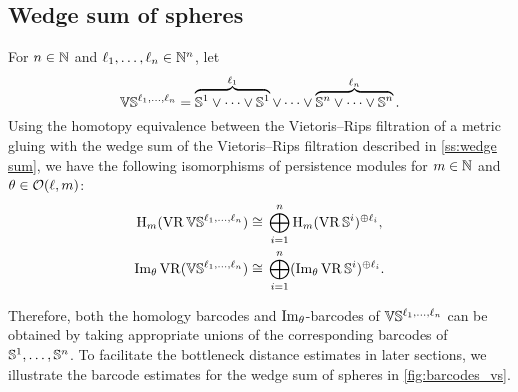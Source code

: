 

\subsection{Wedge sum of spheres}


For $n \in \mathbb{N}$ and $\ell_1, \dots, \ell_n \in \mathbb{N}^n$, let
\[
\mathbb{V}\mathbb{S}^{\ell_1,\dots,\ell_n} =
\overbrace{\mathbb{S}^1\vee\dots\vee\mathbb{S}^1}^{\ell_1} \vee\dots\vee \overbrace{\mathbb{S}^n\vee\dots\vee\mathbb{S}^n}^{\ell_n}.
\]
Using the homotopy equivalence between the Vietoris--Rips filtration of a metric gluing with the wedge sum of the Vietoris--Rips filtration described in \cref{ss:wedge sum}, we have the following isomorphisms of persistence modules for \(m \in \mathbb{N}\) and \(\theta \in \mathcal{O}(\ell,m)\):
\[
\begin{split}
	\mathrm{H}_m (\operatorname{VR}\mathbb{V}\mathbb{S}^{\ell_1,\dots,\ell_n}) &\cong \, \bigoplus_{i=1}^n \mathrm{H}_m (\operatorname{VR}\mathbb{S}^i)^{\oplus \ell_i}, \\
	\operatorname{Im}_\theta \operatorname{VR}(\mathbb{V}\mathbb{S}^{\ell_1,\dots,\ell_n}) &\cong \, \bigoplus_{i=1}^n (\operatorname{Im}_\theta \operatorname{VR}\mathbb{S}^i)^{\oplus \ell_i}.
\end{split}
\]

Therefore, both the homology barcodes and \(\operatorname{Im}_\theta\)-barcodes of \(\mathbb{V}\mathbb{S}^{\ell_1, \dots, \ell_n}\) can be obtained by taking appropriate unions of the corresponding barcodes of \(\mathbb{S}^1, \dots, \mathbb{S}^n\).
To facilitate the bottleneck distance estimates in later sections, we illustrate the barcode estimates for the wedge sum of spheres in \cref{fig:barcodes_vs}.

